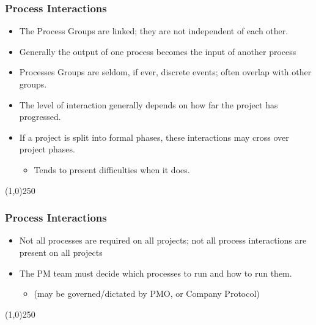 \begin{frame}
\frametitle{Process Interactions}
\begin{itemize}
	\item The Process Groups are linked; they are not independent of each other.\\
	\item Generally the output of one process becomes the input of another process\\
	\item Processes Groups are seldom, if ever, discrete events; often overlap with other groups.\\
	\item The level of interaction generally depends on how far the project has progressed.\\
	\item If a project is split into formal phases, these interactions may cross over project phases. \\ 
		\begin{itemize}
			\item Tends to present difficulties when it does. 
		\end{itemize}
\end{itemize}
\end{frame}
\begin{center}\line(1,0){250}\end{center}



\begin{frame}
\frametitle{Process Interactions}
\begin{itemize}
	\item Not all processes are required on all projects; not all process interactions are present on all projects\\
	\item The PM team must decide which processes to run and how to run them. 
		\begin{itemize}
			\item (may be governed/dictated by PMO, or Company Protocol) 
		\end{itemize}
\end{itemize}
\end{frame}
\begin{center}\line(1,0){250}\end{center}



